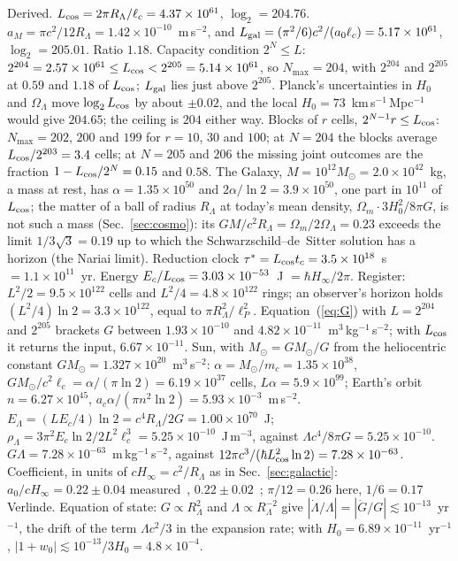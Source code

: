 \documentclass[aps,prd,twocolumn,superscriptaddress,nofootinbib,showkeys]{revtex4-2}
\newcommand{\lc}{\ell_c}
\newcommand{\tc}{t_c}
\newcommand{\mc}{m_c}
\newcommand{\Ec}{E_c}
\newcommand{\ac}{a_c}
\newcommand{\RL}{R_\Lambda}
\begin{document}
Derived. $L_{\rm cos} = 2\pi\RL/\lc = 4.37\times10^{61}$, $\log_2 = 204.76$. $a_M = \pi c^2/12\RL = 1.42\times10^{-10}$~m\,s$^{-2}$, and $L_{\rm gal} = (\pi^2/6)c^2/(a_0\lc) = 5.17\times10^{61}$, $\log_2 = 205.01$. Ratio $1.18$. Capacity condition $2^N\le L$: $2^{204} = 2.57\times10^{61}\le L_{\rm cos} < 2^{205} = 5.14\times10^{61}$, so $N_{\max}=204$, with $2^{204}$ and $2^{205}$ at $0.59$ and $1.18$ of $L_{\rm cos}$; $L_{\rm gal}$ lies just above $2^{205}$. Planck's uncertainties in $H_0$ and $\Omega_\Lambda$ move $\log_2L_{\rm cos}$ by about $\pm0.02$, and the local $H_0 = 73$~km\,s$^{-1}$\,Mpc$^{-1}$ would give $204.65$; the ceiling is $204$ either way. Blocks of $r$ cells, $2^{N-1}r\le L_{\rm cos}$: $N_{\max} = 202$, $200$ and $199$ for $r = 10$, $30$ and $100$; at $N = 204$ the blocks average $L_{\rm cos}/2^{203} = 3.4$ cells; at $N = 205$ and $206$ the missing joint outcomes are the fraction $1 - L_{\rm cos}/2^N = 0.15$ and $0.58$. The Galaxy, $M = 10^{12}M_\odot = 2.0\times10^{42}$~kg, a mass at rest, has $\alpha = 1.35\times10^{50}$ and $2\alpha/\ln2 = 3.9\times10^{50}$, one part in $10^{11}$ of $L_{\rm cos}$; the matter of a ball of radius $\RL$ at today's mean density, $\Omega_m\cdot3H_0^2/8\pi G$, is not such a mass (Sec.~\ref{sec:cosmo}): its $GM/c^2\RL = \Omega_m/2\Omega_\Lambda = 0.23$ exceeds the limit $1/3\sqrt3 = 0.19$ up to which the Schwarzschild--de~Sitter solution has a horizon (the Nariai limit). Reduction clock $\tau^* = L_{\rm cos}\tc = 3.5\times10^{18}$~s $= 1.1\times10^{11}$~yr. Energy $\Ec/L_{\rm cos} = 3.03\times10^{-53}$~J $= \hbar H_\infty/2\pi$. Register: $L^2/2 = 9.5\times10^{122}$ cells and $L^2/4 = 4.8\times10^{122}$ rings; an observer's horizon holds $(L^2/4)\ln2 = 3.3\times10^{122}$, equal to $\pi\RL^2/\ell_P^2$. Equation~(\ref{eq:G}) with $L = 2^{204}$ and $2^{205}$ brackets $G$ between $1.93\times10^{-10}$ and $4.82\times10^{-11}$~m$^3$\,kg$^{-1}$\,s$^{-2}$; with $L_{\rm cos}$ it returns the input, $6.67\times10^{-11}$. Sun, with $M_\odot = GM_\odot/G$ from the heliocentric constant $GM_\odot = 1.327\times10^{20}$~m$^3$\,s$^{-2}$: $\alpha = M_\odot/\mc = 1.35\times10^{38}$, $GM_\odot/c^2\lc = \alpha/(\pi\ln2) = 6.19\times10^{37}$ cells, $L\alpha = 5.9\times10^{99}$; Earth's orbit $n = 6.27\times10^{45}$, $\ac\alpha/(\pi n^2\ln2) = 5.93\times10^{-3}$~m\,s$^{-2}$. $E_\Lambda = (L\Ec/4)\ln2 = c^4\RL/2G = 1.00\times10^{70}$~J; $\rho_\Lambda = 3\pi^2\Ec\ln2/2L^2\lc^3 = 5.25\times10^{-10}$~J\,m$^{-3}$, against $\Lambda c^4/8\pi G = 5.25\times10^{-10}$. $G\Lambda = 7.28\times10^{-63}$~m\,kg$^{-1}$\,s$^{-2}$, against $12\pi c^3/(\hbar L_{\rm cos}^2\ln2) = 7.28\times10^{-63}$. Coefficient, in units of $cH_\infty = c^2/\RL$ as in Sec.~\ref{sec:galactic}: $a_0/cH_\infty = 0.22\pm0.04$ measured~\cite{mcgaugh2016}, $0.22\pm0.02$~\cite{desmond2023}; $\pi/12 = 0.26$ here, $1/6 = 0.17$ Verlinde. Equation of state: $G\propto\RL^2$ and $\Lambda\propto\RL^{-2}$ give $|\dot\Lambda/\Lambda| = |\dot G/G|\lesssim10^{-13}$~yr$^{-1}$, the drift of the term $\Lambda c^2/3$ in the expansion rate; with $H_0 = 6.89\times10^{-11}$~yr$^{-1}$, $|1+w_0| \lesssim 10^{-13}/3H_0 = 4.8\times10^{-4}$.
\end{document}
